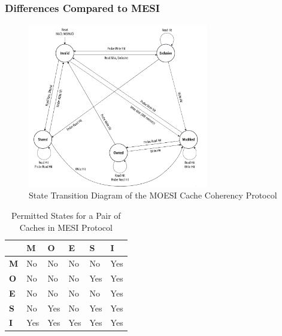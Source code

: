 \documentclass[nonacm,acmsmall,screen,11pt]{acmart}
\begin{document}
\subsubsection{Differences Compared to MESI}


\begin{figure}[htb!]
  \centering
  \includegraphics[width=0.7\textwidth]{moesi}
  \caption{State Transition Diagram of the MOESI Cache Coherency Protocol}
  \label{fig:moesi}
\end{figure}

\begin{table}[htb!]
  \centering
  \caption{Permitted States for a Pair of Caches in MESI Protocol}
  \label{tab:moesi}
  \begin{tabular}{|l|l|l|l|l|l|}
    \hline
               & \textbf{M} & \textbf{O} & \textbf{E} & \textbf{S} & \textbf{I} \\ \hline
    \textbf{M} & No         & No         & No         & No         & Yes        \\ \hline
    \textbf{O} & No         & No         & No         & Yes        & Yes        \\ \hline
    \textbf{E} & No         & No         & No         & No         & Yes        \\ \hline
    \textbf{S} & No         & Yes        & No         & Yes        & Yes        \\ \hline
    \textbf{I} & Yes        & Yes        & Yes        & Yes        & Yes        \\ \hline
  \end{tabular}
\end{table}
\end{document}
